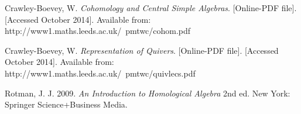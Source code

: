 \documentclass[11.5pt, twoside, a4paper, titlepage]{report}
\theoremstyle{definition}
\theoremstyle{plain}
\begin{document}
\begin{thebibliography}{99}

Crawley-Boevey, W.
\emph{Cohomology and Central Simple Algebras}. [Online-PDF file]. [Accessed October 2014].
Available from: http://www1.maths.leeds.ac.uk/~pmtwc/cohom.pdf

Crawley-Boevey, W.
\emph{Representation of Quivers}. [Online-PDF file]. [Accessed October 2014].
Available from: http://www1.maths.leeds.ac.uk/~pmtwc/quivlecs.pdf

Rotman, J. J.
2009.
\emph{An Introduction to Homological Algebra}
2nd ed.
New York: Springer Science+Business Media.



\end{thebibliography}
\end{document}
